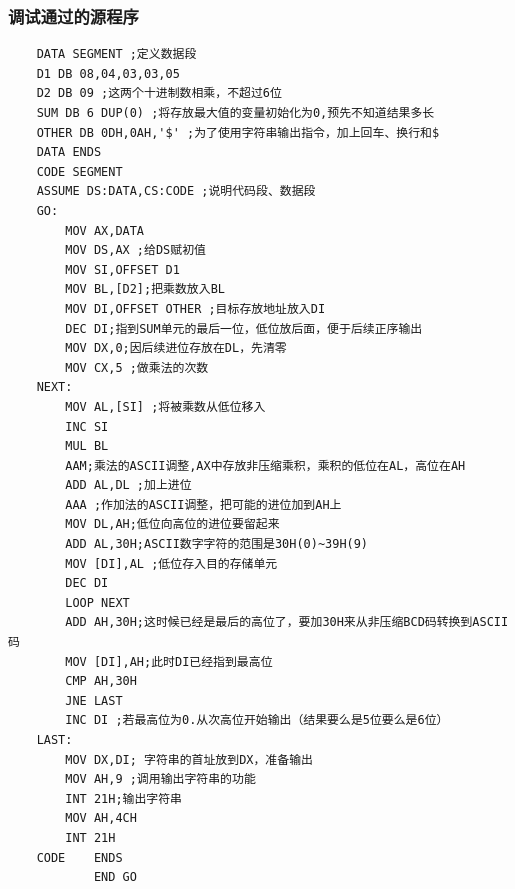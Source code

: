 \documentclass[12pt, a4paper, oneside]{ctexart}
\begin{document}
\subsubsection{调试通过的源程序}
\begin{lstlisting}
    DATA SEGMENT ;定义数据段
    D1 DB 08,04,03,03,05
    D2 DB 09 ;这两个十进制数相乘，不超过6位
    SUM DB 6 DUP(0) ;将存放最大值的变量初始化为0,预先不知道结果多长
    OTHER DB 0DH,0AH,'$' ;为了使用字符串输出指令，加上回车、换行和$
    DATA ENDS
    CODE SEGMENT 
    ASSUME DS:DATA,CS:CODE ;说明代码段、数据段
    GO: 
        MOV AX,DATA 
        MOV DS,AX ;给DS赋初值
        MOV SI,OFFSET D1 
        MOV BL,[D2];把乘数放入BL
        MOV DI,OFFSET OTHER ;目标存放地址放入DI
        DEC DI;指到SUM单元的最后一位，低位放后面，便于后续正序输出
        MOV DX,0;因后续进位存放在DL，先清零
        MOV CX,5 ;做乘法的次数
    NEXT:
        MOV AL,[SI] ;将被乘数从低位移入
        INC SI
        MUL BL
        AAM;乘法的ASCII调整,AX中存放非压缩乘积，乘积的低位在AL，高位在AH
        ADD AL,DL ;加上进位
        AAA ;作加法的ASCII调整，把可能的进位加到AH上
        MOV DL,AH;低位向高位的进位要留起来
        ADD AL,30H;ASCII数字字符的范围是30H(0)~39H(9)
        MOV [DI],AL ;低位存入目的存储单元
        DEC DI
        LOOP NEXT
        ADD AH,30H;这时候已经是最后的高位了，要加30H来从非压缩BCD码转换到ASCII码
        MOV [DI],AH;此时DI已经指到最高位
        CMP AH,30H
        JNE LAST
        INC DI ;若最高位为0.从次高位开始输出（结果要么是5位要么是6位）
    LAST:
        MOV DX,DI; 字符串的首址放到DX，准备输出
        MOV AH,9 ;调用输出字符串的功能
        INT 21H;输出字符串
        MOV AH,4CH
        INT 21H
    CODE 	ENDS
            END GO
\end{lstlisting}
\end{document}

